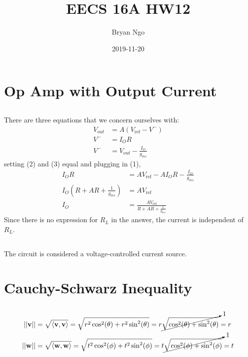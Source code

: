\documentclass[]{article}
\title{EECS 16A HW12}
\author{Bryan Ngo}
\date{2019-11-20}
\newcommand{\iprod}[2]{\left\langle #1, #2 \right\rangle}
\renewcommand{\vec}[1]{\mathbf{#1}}
\begin{document}
\maketitle

\section{Op Amp with Output Current}

\subsection{}

There are three equations that we concern ourselves with: 
\begin{align}
	V_{out} &= A(V_{\text{ref}} - V^-) \\
	V^- &= I_O R \\
	V^- &= V_{out} - \frac{I_O}{g_{ms}}
\end{align}
setting (2) and (3) equal and plugging in (1), 
\begin{align}
	I_O R &= A V_{\text{ref}} - A I_O R - \frac{I_O}{g_{ms}} \\
	I_O \left(R + AR + \frac{1}{g_{ms}}\right) &= A V_{\text{ref}} \\
	I_O &= \frac{AV_{\text{ref}}}{R + AR + \frac{1}{g_{ms}}}
\end{align}
Since there is no expression for \(R_L\) in the answer, the current is independent of \(R_L\). 

\subsection{}

The circuit is considered a voltage-controlled current source. 

\section{Cauchy-Schwarz Inequality}

\subsection{}

\begin{align}
	||\vec{v}|| &= \sqrt{\iprod{\vec{v}}{\vec{v}}} = \sqrt{r^2 \cos^2(\theta) + r^2 \sin^2(\theta)} = r\cancelto{1}{\sqrt{\cos^2(\theta) + \sin^2(\theta)}} = r \\
	||\vec{w}|| &= \sqrt{\iprod{\vec{w}}{\vec{w}}} = \sqrt{t^2 \cos^2(\phi) + t^2 \sin^2(\phi)} = t\cancelto{1}{\sqrt{\cos^2(\phi) + \sin^2(\phi)}} = t
\end{align}
\end{document}
